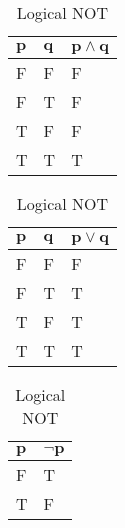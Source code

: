 \begin{table}[h]
    \centering
    \begin{minipage}{.3\linewidth}
        \centering
        \begin{tabular}{|l|l||l|}
            \hline
            $\boldsymbol{p}$ & $\boldsymbol{q}$ & $\boldsymbol{p \land q}$ \\ \hline
            F   & F   & F          \\ \hline
            F   & T   & F          \\ \hline
            T   & F   & F          \\ \hline
            T   & T   & T          \\ \hline
        \end{tabular}
        \caption{Logical AND}
    \end{minipage}
    \begin{minipage}{.3\linewidth}
        \centering
        \begin{tabular}{|l|l||l|}
            \hline
            $\boldsymbol{p}$ & $\boldsymbol{q}$ & $\boldsymbol{p \lor q}$ \\ \hline
            F   & F   & F         \\ \hline
            F   & T   & T         \\ \hline
            T   & F   & T         \\ \hline
            T   & T   & T         \\ \hline
        \end{tabular}
        \caption{Logical OR}
    \end{minipage}
    \begin{minipage}{.3\linewidth}
        \centering
        \begin{tabular}{|l||l|}
            \hline
            $\boldsymbol{p}$ & $\boldsymbol{\lnot p}$ \\ \hline
            F   & T         \\ \hline
            T   & F         \\ \hline
        \end{tabular}
        \caption{Logical NOT}
    \end{minipage}
\end{table}

